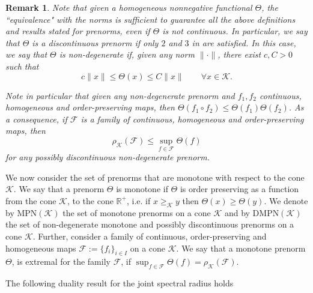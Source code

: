 \documentclass{article}
\newtheorem{remark}[theorem]{Remark}
\newcommand{\R}{\mathbb{R}}
\newcommand{\family}{\mathcal{F}}
\newcommand{\cradius}{\rho_{\cone}}
\newcommand{\MPN}{\mathrm{MPN}}
\newcommand{\DMPN}{\mathrm{DMPN}}
\newcommand{\cone}{\mathcal{K}}
\newcommand{\cgeq}{\geq_{\cone}}
\begin{document}
\begin{remark}
Note that given a homogeneous nonnegative functional $\Theta$, the 
“equivalence" with the norms is sufficient to guarantee all the above definitions and results stated for prenorms, even if $\Theta$ is not continuous. In particular, we say that $\Theta$ is a discontinuous prenorm if only $2$ and $3$ in  are satisfied. In this case, we say that $\Theta$ is non-degenerate if, given any norm $\|\cdot\|$, there exist $c,C>0$ such that 
%
\begin{equation}
    c\|x\|\leq \Theta(x)\leq C\|x\| \qquad \forall x\in \cone.
\end{equation}
%

Note in particular that given any non-degenerate prenorm and $f_1,f_2$ continuous, homogeneous and order-preserving maps, then $\Theta(f_1\circ f_2)\leq \Theta(f_1)\Theta(f_2)$.
%
As a consequence, if $\family$ is a family of continuous, homogeneous and order-preserving maps, then 
\begin{equation}\label{sub_mult_prenorms}
    \cradius(\family)\leq \sup_{f\in \family}\Theta(f)
\end{equation} 
for any possibly discontinuous non-degenerate prenorm.
\end{remark}

%
We now consider the set of prenorms that are monotone with respect to the cone $\cone$.
We say that a prenorm $\Theta$ is monotone if $\Theta$ is order preserving as a function from the cone $\cone$, to the cone $\R^+$, i.e. if $x\cgeq y$ then $\Theta(x) \geq \Theta(y)$. We denote by $\MPN(\cone)$ the set of monotone prenorms on a cone $\cone$ and by $\DMPN(\cone)$ the set of non-degenerate monotone and possibly discontinuous prenorms on a cone $\cone$.
%
%
%
%
%
Further, consider a family of continuous, order-preserving and homogeneous maps $\family := \{f_i\}_{i\in I}$ on a cone $\cone$. We say that a monotone prenorm $\Theta$, is extremal for the family  $\family$, if $\sup_{f\in\family}\Theta(f)=\cradius(\family)$.

The following duality result for the joint spectral radius holds
%
\end{document}
